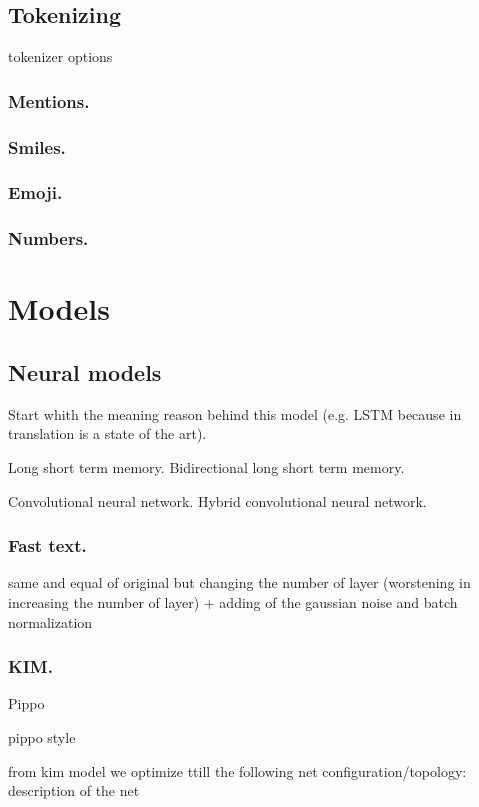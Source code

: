 \subsection{Tokenizing}

tokenizer options

\subsubsection{Mentions.}
\subsubsection{Smiles.}
\subsubsection{Emoji.}
\subsubsection{Numbers.}


\section{Models}

 	

\subsection{Neural models}

Start whith the meaning reason behind this model (e.g. LSTM because in translation is a state of the art).

Long short term memory.
Bidirectional long short term memory.

Convolutional neural network.
Hybrid convolutional neural network.

\subsubsection{Fast text.}

same and equal of original but changing the number of layer  (worstening in increasing the number of layer) + adding of the gaussian noise and batch normalization

\subsubsection{KIM.}

Pippo \cite{kim2014convolutional}

pippo style \citep{kim2014convolutional}

from kim model we optimize ttill the following net configuration/topology: description of the net
